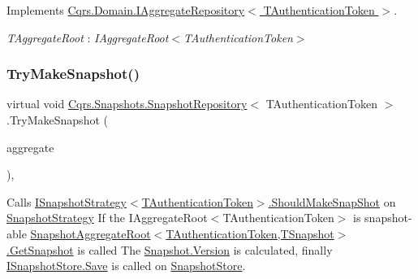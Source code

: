 Implements \hyperlink{interfaceCqrs_1_1Domain_1_1IAggregateRepository_a306baf8aa6faabe893f93e5db5d3517d_a306baf8aa6faabe893f93e5db5d3517d}{Cqrs.\+Domain.\+I\+Aggregate\+Repository$<$ T\+Authentication\+Token $>$}.

\begin{Desc}
\item[Type Constraints]\begin{description}
\item[{\em T\+Aggregate\+Root} : {\em I\+Aggregate\+Root$<$T\+Authentication\+Token$>$}]\end{description}
\end{Desc}
\mbox{\label{classCqrs_1_1Snapshots_1_1SnapshotRepository_a06b3211ded753ed79c3080819b16d496_a06b3211ded753ed79c3080819b16d496}} 
\subsubsection{\texorpdfstring{Try\+Make\+Snapshot()}{TryMakeSnapshot()}}
{\footnotesize\ttfamily virtual void \hyperlink{classCqrs_1_1Snapshots_1_1SnapshotRepository}{Cqrs.\+Snapshots.\+Snapshot\+Repository}$<$ T\+Authentication\+Token $>$.Try\+Make\+Snapshot (\begin{DoxyParamCaption}\item[{\hyperlink{interfaceCqrs_1_1Domain_1_1IAggregateRoot}{I\+Aggregate\+Root}$<$ T\+Authentication\+Token $>$}]{aggregate }\end{DoxyParamCaption})\hspace{0.3cm}{\ttfamily [protected]}, {\ttfamily [virtual]}}



Calls \hyperlink{interfaceCqrs_1_1Snapshots_1_1ISnapshotStrategy_ab1d54cd76c7ac832329cb3a6de0effcd_ab1d54cd76c7ac832329cb3a6de0effcd}{I\+Snapshot\+Strategy$<$\+T\+Authentication\+Token$>$.\+Should\+Make\+Snap\+Shot} on \hyperlink{classCqrs_1_1Snapshots_1_1SnapshotRepository_a7d65b4df10d0b6f75c911a9b6d59b3ba_a7d65b4df10d0b6f75c911a9b6d59b3ba}{Snapshot\+Strategy} If the I\+Aggregate\+Root$<$\+T\+Authentication\+Token$>$ is snapshot-\/able \hyperlink{classCqrs_1_1Snapshots_1_1SnapshotAggregateRoot_a30ec8fe3a09fec8238c5921c629a5ac1_a30ec8fe3a09fec8238c5921c629a5ac1}{Snapshot\+Aggregate\+Root$<$\+T\+Authentication\+Token,\+T\+Snapshot$>$.\+Get\+Snapshot} is called The \hyperlink{classCqrs_1_1Snapshots_1_1Snapshot_a59c0a399430e5f4a1b27d999c3bb5d4f_a59c0a399430e5f4a1b27d999c3bb5d4f}{Snapshot.\+Version} is calculated, finally \hyperlink{interfaceCqrs_1_1Snapshots_1_1ISnapshotStore_a6e99c620115ce8a0648a83bf2ce05527_a6e99c620115ce8a0648a83bf2ce05527}{I\+Snapshot\+Store.\+Save} is called on \hyperlink{classCqrs_1_1Snapshots_1_1SnapshotRepository_aba01e9f20eb41e6f3e4476a7f3182275_aba01e9f20eb41e6f3e4476a7f3182275}{Snapshot\+Store}. 


